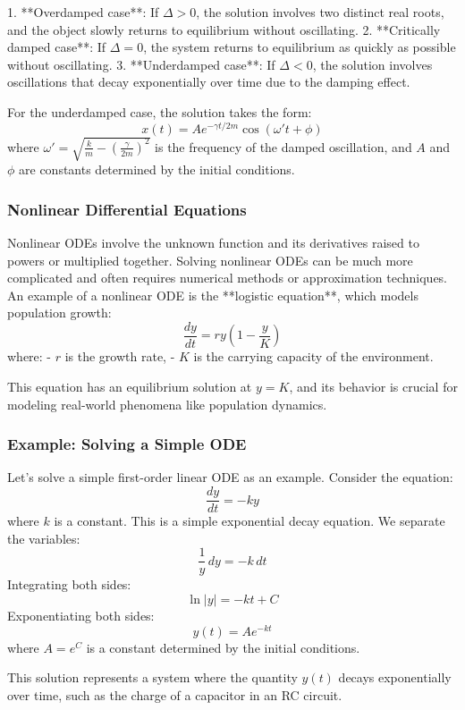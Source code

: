 \documentclass{article}
\begin{document}
1. **Overdamped case**: If \( \Delta > 0 \), the solution involves two distinct real roots, and the object slowly returns to equilibrium without oscillating.
2. **Critically damped case**: If \( \Delta = 0 \), the system returns to equilibrium as quickly as possible without oscillating.
3. **Underdamped case**: If \( \Delta < 0 \), the solution involves oscillations that decay exponentially over time due to the damping effect.

For the underdamped case, the solution takes the form:
\[
x(t) = A e^{-\gamma t / 2m} \cos(\omega' t + \phi)
\]
where \( \omega' = \sqrt{\frac{k}{m} - \left( \frac{\gamma}{2m} \right)^2} \) is the frequency of the damped oscillation, and \( A \) and \( \phi \) are constants determined by the initial conditions.

\subsubsection*{Nonlinear Differential Equations}

Nonlinear ODEs involve the unknown function and its derivatives raised to powers or multiplied together. Solving nonlinear ODEs can be much more complicated and often requires numerical methods or approximation techniques. An example of a nonlinear ODE is the **logistic equation**, which models population growth:
\[
\frac{dy}{dt} = ry(1 - \frac{y}{K})
\]
where:
- \( r \) is the growth rate,
- \( K \) is the carrying capacity of the environment.

This equation has an equilibrium solution at \( y = K \), and its behavior is crucial for modeling real-world phenomena like population dynamics.

\subsubsection*{Example: Solving a Simple ODE}

Let's solve a simple first-order linear ODE as an example. Consider the equation:
\[
\frac{dy}{dt} = -ky
\]
where \( k \) is a constant. This is a simple exponential decay equation. We separate the variables:
\[
\frac{1}{y} \, dy = -k \, dt
\]
Integrating both sides:
\[
\ln |y| = -kt + C
\]
Exponentiating both sides:
\[
y(t) = A e^{-kt}
\]
where \( A = e^C \) is a constant determined by the initial conditions.

This solution represents a system where the quantity \( y(t) \) decays exponentially over time, such as the charge of a capacitor in an RC circuit.
\end{document}
